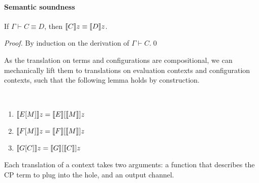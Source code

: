 \documentclass[orivec,envcountsame]{llncs}
\begin{document}
\paragraph{Semantic soundness}

\begin{theorem}
If $\Gamma \vdash C \equiv D$, then $\llbracket C \rrbracket z \equiv \llbracket D \rrbracket z$.
\end{theorem}
%
\begin{proof}
By induction on the derivation of $\Gamma \vdash C$.\qed
\end{proof}

As the translation on terms and configurations are compositional, we can mechanically lift them to
translations on evaluation contexts and configuration contexts, such that the following lemma holds
by construction.
%
%
\begin{lemma}
~
\begin{enumerate}
\item $\llbracket E[M] \rrbracket z = \llbracket E \rrbracket[\llbracket M \rrbracket]z$
\item $\llbracket F[M] \rrbracket z = \llbracket F \rrbracket[\llbracket M \rrbracket]z$
\item $\llbracket G[C] \rrbracket z = \llbracket G \rrbracket[\llbracket C \rrbracket]z$
\end{enumerate}
\end{lemma}
Each translation of a context takes two arguments: a function that describes the CP term to plug
into the hole, and an output channel.

\end{document}
